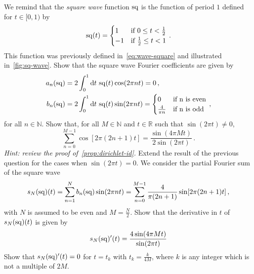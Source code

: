 \begin{Exercise}[title={Gibbs Phenomenon for the square wave},name={Problem},label=gibbs]
  We remind that the \emph{square wave} function $\operatorname{sq}$ is the function of period $1$ defined
  for $t\in[0,1)$ by
  \begin{equation}
    \operatorname{sq}(t)=
    \begin{cases}
      1&\text{if}~0\leq t <\frac{1}{2}\\
      -1&\text{if}~\frac{1}{2}\leq t < 1
    \end{cases}\,.
  \end{equation}
  This function was previously defined in~\cref{eq:wave-square} and illustrated
  in~\cref{fig:sq-wave}.
  \Question Show that the square wave Fourier coefficients are given by
  \begin{align}
    a_n(\sq)&=2\int_0^1\diff t\,\sq(t)\cos(2\pi nt)=0\,,\\
    b_n(\sq)&=2\int_0^1\diff t\,\sq(t)\sin(2\pi nt)=
    \begin{cases}
      0&\text{if}~$n$~\text{is even}\\
      \frac{4}{\pi n}&\text{if}~$n$~\text{is odd}
    \end{cases}\,,
  \end{align}
  for all $n\in\mathbb{N}$.
  \Question Show that, for all $M\in\mathbb{N}$ and $t\in\mathbb{R}$ such that $\sin(2\pi t)\neq 0$,
  \begin{equation}
    \sum_{n=0}^{M-1}\cos[2\pi(2n+1)t]=\frac{\sin(4\pi Mt)}{2\sin(2\pi t)}\,.
  \end{equation}
  \emph{Hint: review the proof of~\cref{prop:dirichlet-id}.}
  \Question Extend the result of the previous question for the cases when $\sin(2\pi t)=0$.
  \Question We consider the partial Fourier sum of the square wave
  \begin{equation}
    s_{N}(\operatorname{sq})(t)=\sum_{n=1}^N b_n(\operatorname{sq})\sin(2\pi n t)=\sum_{n=0}^{M-1}\frac{4}{\pi(2n+1)}\sin[2\pi(2n+1)t]\,,
  \end{equation}
  with $N$ is assumed to be even and $M=\frac{N}{2}$.
  \subQuestion Show that the derivative in $t$ of $s_{N}(\operatorname{sq})(t)$ is given by
  \begin{equation}
    s_{N}(\operatorname{sq})'(t)=\frac{4\sin(4\pi Mt)}{\sin(2\pi t)}
  \end{equation}
  \subQuestion Show that $s_{N}(\operatorname{sq})'(t)=0$ for $t=t_k$ with $t_k=\frac{k}{4M}$,
  where $k$ is any integer which is not a multiple of $2M$.

\end{Exercise}
